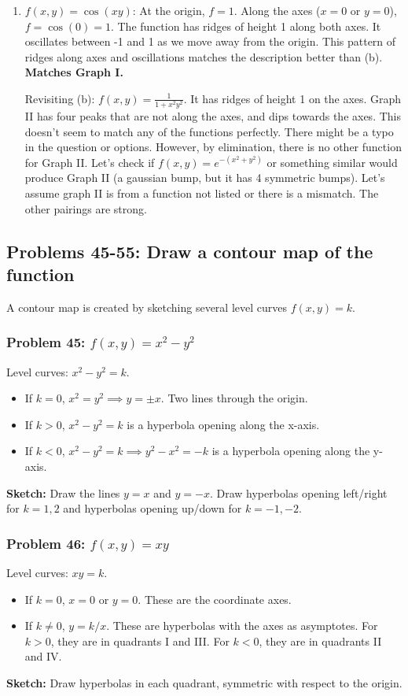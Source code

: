 \documentclass{article}
\begin{document}
\begin{enumerate}[label=\alph*.]
    \item $f(x, y) = \cos(xy)$: At the origin, $f=1$. Along the axes ($x=0$ or $y=0$), $f = \cos(0) = 1$. The function has ridges of height 1 along both axes. It oscillates between -1 and 1 as we move away from the origin. This pattern of ridges along axes and oscillations matches the description better than (b). \textbf{Matches Graph I.}
    
    Revisiting (b): $f(x, y) = \frac{1}{1 + x^2y^2}$. It has ridges of height 1 on the axes. Graph II has four peaks that are not along the axes, and dips towards the axes. This doesn't seem to match any of the functions perfectly. There might be a typo in the question or options. However, by elimination, there is no other function for Graph II. Let's check if $f(x,y)=e^{-(x^2+y^2)}$ or something similar would produce Graph II (a gaussian bump, but it has 4 symmetric bumps). Let's assume graph II is from a function not listed or there is a mismatch. The other pairings are strong.
\end{enumerate}

\subsection{Problems 45-55: Draw a contour map of the function}
A contour map is created by sketching several level curves $f(x, y) = k$.

\subsubsection{Problem 45: $f(x, y) = x^2 - y^2$}
Level curves: $x^2 - y^2 = k$.
\begin{itemize}
    \item If $k=0$, $x^2 = y^2 \implies y = \pm x$. Two lines through the origin.
    \item If $k > 0$, $x^2 - y^2 = k$ is a hyperbola opening along the x-axis.
    \item If $k < 0$, $x^2 - y^2 = k \implies y^2 - x^2 = -k$ is a hyperbola opening along the y-axis.
\end{itemize}
\textbf{Sketch:} Draw the lines $y=x$ and $y=-x$. Draw hyperbolas opening left/right for $k=1, 2$ and hyperbolas opening up/down for $k=-1, -2$.

\subsubsection{Problem 46: $f(x, y) = xy$}
Level curves: $xy=k$.
\begin{itemize}
    \item If $k=0$, $x=0$ or $y=0$. These are the coordinate axes.
    \item If $k \neq 0$, $y = k/x$. These are hyperbolas with the axes as asymptotes. For $k>0$, they are in quadrants I and III. For $k<0$, they are in quadrants II and IV.
\end{itemize}
\textbf{Sketch:} Draw hyperbolas in each quadrant, symmetric with respect to the origin.
\end{document}
